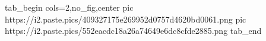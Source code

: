  
 
 
 
 


\ifcmt
  tab_begin cols=2,no_fig,center
     pic https://i2.paste.pics/409327175e269952d0757d4620bd0061.png
		 pic https://i2.paste.pics/552eacdc18a26a74649e6dc8cfde2885.png
  tab_end
\fi
